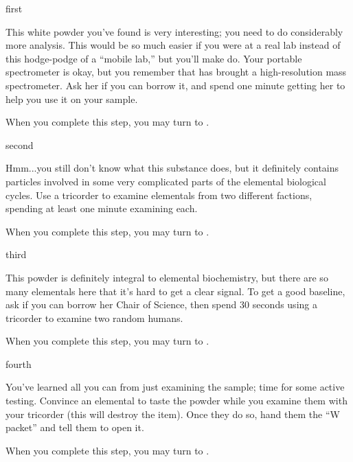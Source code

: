\documentclass[notebook]{elementals}
\begin{document}

\startnotebook{\nWhiteResearch{}}

\begin{page}{first}

This white powder you've found is very interesting; you need to do considerably more analysis. This would be so much easier if you were at a real lab instead of this hodge-podge of a ``mobile lab,'' but you'll make do. Your portable spectrometer is okay, but you remember that \cGD{} has brought a high-resolution mass spectrometer. Ask her if you can borrow it, and spend one minute getting her to help you use it on your sample.

When you complete this step, you may turn to .

\end{page}

\begin{page}{second}

Hmm...you still don't know what this substance does, but it definitely contains particles involved in some very complicated parts of the elemental biological cycles. Use a tricorder to examine elementals from two different factions, spending at least one minute examining each.

When you complete this step, you may turn to .

\end{page}

\begin{page}{third}

This powder is definitely integral to elemental biochemistry, but there are so many elementals here that it's hard to get a clear signal. To get a good baseline, ask \cGD{} if you can borrow her Chair of Science, then spend 30 seconds using a tricorder to examine two random humans.

When you complete this step, you may turn to .

\end{page}

\begin{page}{fourth}

You've learned all you can from just examining the sample; time for some active testing. Convince an elemental to taste the powder while you examine them with your tricorder (this will destroy the item). Once they do so, hand them the ``W packet'' and tell them to open it.

When you complete this step, you may turn to .

\end{page}
\end{document}
